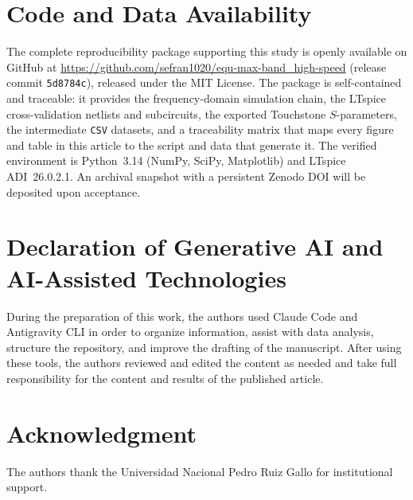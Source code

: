 \documentclass{ieeeaccess}
\begin{document}
\section*{Code and Data Availability}
The complete reproducibility package supporting this study is openly
available on GitHub at
\url{https://github.com/sefran1020/equ-max-band_high-speed} (release commit
\texttt{5d8784c}), released under the MIT License. The package is
self-contained and traceable: it provides the frequency-domain simulation
chain, the LTspice cross-validation netlists and subcircuits, the exported
Touchstone $S$-parameters, the intermediate \texttt{CSV} datasets, and a
traceability matrix that maps every figure and table in this article to the
script and data that generate it. The verified environment is Python~3.14
(NumPy, SciPy, Matplotlib) and LTspice ADI~26.0.2.1. An archival snapshot
with a persistent Zenodo DOI will be deposited upon acceptance.

\section*{Declaration of Generative AI and AI-Assisted Technologies}
During the preparation of this work, the authors used Claude Code and
Antigravity CLI in order to organize information, assist with data analysis,
structure the repository, and improve the drafting of the manuscript. After
using these tools, the authors reviewed and edited the content as needed and
take full responsibility for the content and results of the published
article.

\section*{Acknowledgment}
The authors thank the Universidad Nacional Pedro Ruiz Gallo for institutional
support.






\end{document}
